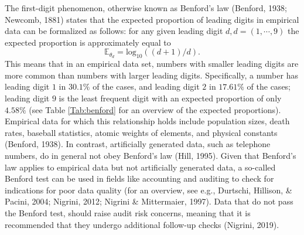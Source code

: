 \documentclass[
  english,
  man,floatsintext]{apa6}
\begin{document}
\noindent The first-digit phenomenon, otherwise known as Benford's law (Benford, 1938; Newcomb, 1881) states that the expected proportion of leading digits in empirical data can be formalized as follows: for any given leading digit \(d, d = (1, \cdots, 9)\) the expected proportion is approximately equal to \[\mathbb{E}_{\theta_d}= \text{log}_{10}((d + 1)/d).\] This means that in an empirical data set, numbers with smaller leading digits are more common than numbers with larger leading digits. Specifically, a number has leading digit \(1\) in \(30.1 \%\) of the cases, and leading digit \(2\) in \(17.61 \%\) of the cases; leading digit \(9\) is the least frequent digit with an expected proportion of only \(4.58 \%\) (see Table \ref{Tab:benford} for an overview of the expected proportions). Empirical data for which this relationship holds include population sizes, death rates, baseball statistics, atomic weights of elements, and physical constants (Benford, 1938). In contrast, artificially generated data, such as telephone numbers, do in general not obey Benford's law (Hill, 1995). Given that Benford's law applies to empirical data but not artificially generated data, a so-called Benford test can be used in fields like accounting and auditing to check for indications for poor data quality (for an overview, see e.g., Durtschi, Hillison, \& Pacini, 2004; Nigrini, 2012; Nigrini \& Mittermaier, 1997). Data that do not pass the Benford test, should raise audit risk concerns, meaning that it is recommended that they undergo additional follow-up checks (Nigrini, 2019).
\end{document}
